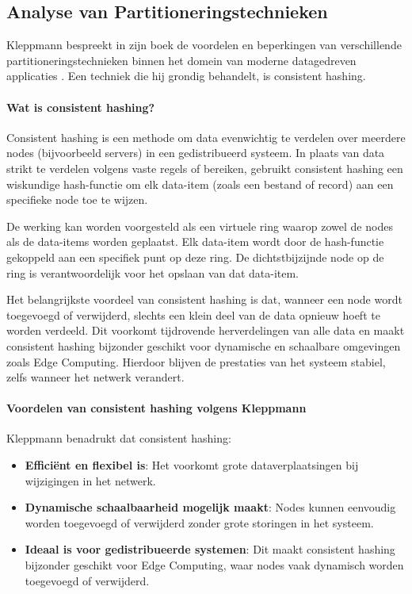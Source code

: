 \subsection{Analyse van Partitioneringstechnieken}

Kleppmann bespreekt in zijn boek de voordelen en beperkingen van verschillende partitioneringstechnieken binnen het domein van moderne datagedreven applicaties \autocite{Kleppmann2017}.
Een techniek die hij grondig behandelt, is consistent hashing.

\paragraph{Wat is consistent hashing?}  
Consistent hashing is een methode om data evenwichtig te verdelen over meerdere nodes (bijvoorbeeld servers) in een gedistribueerd systeem. In plaats van data strikt te verdelen volgens vaste regels of bereiken, gebruikt consistent hashing een wiskundige hash-functie om elk data-item (zoals een bestand of record) aan een specifieke node toe te wijzen.  
 
De werking kan worden voorgesteld als een virtuele ring waarop zowel de nodes als de data-items worden geplaatst. Elk data-item wordt door de hash-functie gekoppeld aan een specifiek punt op deze ring. De dichtstbijzijnde node op de ring is verantwoordelijk voor het opslaan van dat data-item.  
 
Het belangrijkste voordeel van consistent hashing is dat, wanneer een node wordt toegevoegd of verwijderd, slechts een klein deel van de data opnieuw hoeft te worden verdeeld. Dit voorkomt tijdrovende herverdelingen van alle data en maakt consistent hashing bijzonder geschikt voor dynamische en schaalbare omgevingen zoals Edge Computing. Hierdoor blijven de prestaties van het systeem stabiel, zelfs wanneer het netwerk verandert.
 
\paragraph{Voordelen van consistent hashing volgens Kleppmann}  
Kleppmann benadrukt dat consistent hashing:  
\begin{itemize}
    \item \textbf{Efficiënt en flexibel is}: Het voorkomt grote dataverplaatsingen bij wijzigingen in het netwerk.  
    \item \textbf{Dynamische schaalbaarheid mogelijk maakt}: Nodes kunnen eenvoudig worden toegevoegd of verwijderd zonder grote storingen in het systeem.  
    \item \textbf{Ideaal is voor gedistribueerde systemen}: Dit maakt consistent hashing bijzonder geschikt voor Edge Computing, waar nodes vaak dynamisch worden toegevoegd of verwijderd.  
\end{itemize}
 
